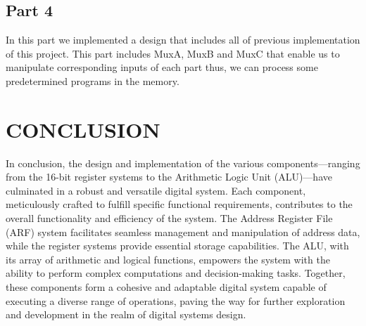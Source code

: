 \documentclass[pdftex,12pt,a4paper]{article}
\begin{document}
\subsection{Part 4} 
In this part we implemented a design that includes all of previous implementation of this project. This part includes MuxA, MuxB and MuxC that enable us to manipulate corresponding inputs of each part thus, we can process some predetermined programs in the memory.

\section{CONCLUSION}
In conclusion, the design and implementation of the various components—ranging from the 16-bit register systems to the Arithmetic Logic Unit (ALU)—have culminated in a robust and versatile digital system. Each component, meticulously crafted to fulfill specific functional requirements, contributes to the overall functionality and efficiency of the system. The Address Register File (ARF) system facilitates seamless management and manipulation of address data, while the register systems provide essential storage capabilities. The ALU, with its array of arithmetic and logical functions, empowers the system with the ability to perform complex computations and decision-making tasks. Together, these components form a cohesive and adaptable digital system capable of executing a diverse range of operations, paving the way for further exploration and development in the realm of digital systems design.


\newpage
{}



\end{document}
